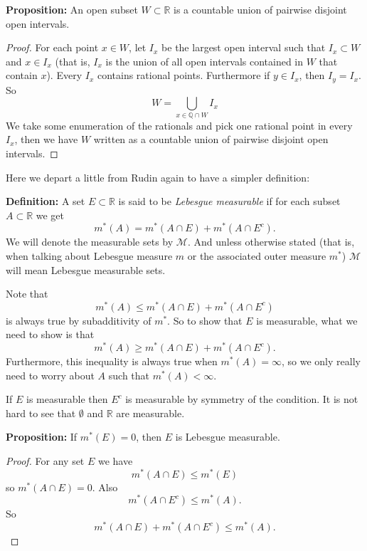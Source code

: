 \documentclass[12pt]{book}
\newcommand{\R}{{\mathbb{R}}}
\newcommand{\Q}{{\mathbb{Q}}}
\newcommand{\sM}{{\mathcal{M}}}
\theoremstyle{plain}
\theoremstyle{remark}
\theoremstyle{definition}
\theoremstyle{exercise}
\theoremstyle{example}
\begin{document}
\medskip

\textbf{Proposition:}
An open subset $W \subset \R$ is a countable union of pairwise
disjoint open intervals.

\medskip

\begin{proof}
For each point $x \in W$, let $I_x$ be the largest open interval such
that $I_x \subset W$ and $x \in I_x$ (that is, $I_x$ is the union of all
open intervals contained in $W$ that contain $x$).  Every $I_x$ contains
rational points.  Furthermore if $y \in I_x$, then $I_y = I_x$.  So
$$
W = \bigcup_{x \in \Q \cap W} I_x
$$
We take some enumeration of the rationals and pick one rational
point in every $I_x$, then we have $W$ written as a countable union of
pairwise disjoint open intervals.
\end{proof}

\medskip

Here we depart a little from Rudin again to have a simpler definition:

\textbf{Definition:}
A set $E \subset \R$ is said to be \emph{Lebesgue measurable}
if for each subset $A \subset \R$ we get
$$
m^*(A) = m^*(A \cap E) + m^*(A \cap E^c) .
$$
We will denote the measurable sets by $\sM$.  And unless otherwise stated
(that is, when talking about Lebesgue measure $m$ or the associated outer
measure $m^*$) $\sM$ will mean Lebesgue measurable sets.

Note that
$$
m^*(A) \leq m^*(A \cap E) + m^*(A \cap E^c)
$$
is always true by subadditivity of $m^*$.  So to show that $E$ is measurable,
what we need to show is that
$$
m^*(A) \geq m^*(A \cap E) + m^*(A \cap E^c).
$$
Furthermore, this inequality is always true when $m^*(A) = \infty$, so
we only really need to worry about $A$ such that $m^*(A) < \infty$.

If $E$ is measurable then $E^c$ is measurable by symmetry of the
condition.  It is not hard
to see that $\emptyset$ and $\R$ are measurable.

\medskip

\textbf{Proposition:}
If $m^*(E) = 0$, then $E$ is Lebesgue measurable.

\medskip

\begin{proof}
For any set $E$ we have
$$
m^*(A \cap E) \leq m^*(E)
$$
so $m^*(A \cap E) = 0$.  Also
$$
m^*(A \cap E^c) \leq m^*(A) .
$$
So
$$
m^*(A \cap E) + m^*(A \cap E^c) \leq m^*(A) .
$$
\end{proof}

\medskip
\end{document}
